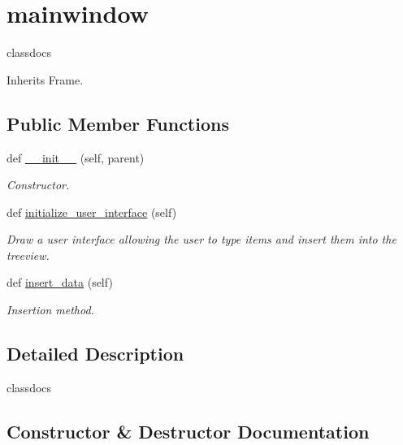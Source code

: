 \hypertarget{classbackpack_1_1src_1_1gui_1_1Tests_1_1Test2_1_1mainwindow}{}\section{mainwindow}
\label{classbackpack_1_1src_1_1gui_1_1Tests_1_1Test2_1_1mainwindow}


classdocs  




Inherits Frame.

\subsection*{Public Member Functions}
\begin{DoxyCompactItemize}
\item 
def \mbox{\hyperlink{classbackpack_1_1src_1_1gui_1_1Tests_1_1Test2_1_1mainwindow_a75020e7f3888d6f837fae592b305add8}{\+\_\+\+\_\+init\+\_\+\+\_\+}} (self, parent)
\begin{DoxyCompactList}\small\item\em Constructor. \end{DoxyCompactList}\item 
def \mbox{\hyperlink{classbackpack_1_1src_1_1gui_1_1Tests_1_1Test2_1_1mainwindow_a0f0c0d7bcb2c8a27adaafec4a451192e}{initialize\+\_\+user\+\_\+interface}} (self)
\begin{DoxyCompactList}\small\item\em Draw a user interface allowing the user to type items and insert them into the treeview. \end{DoxyCompactList}\item 
def \mbox{\hyperlink{classbackpack_1_1src_1_1gui_1_1Tests_1_1Test2_1_1mainwindow_a25ecc71dd76d8318250b20bed2e260bb}{insert\+\_\+data}} (self)
\begin{DoxyCompactList}\small\item\em Insertion method. \end{DoxyCompactList}\end{DoxyCompactItemize}


\subsection{Detailed Description}
classdocs 

\subsection{Constructor \& Destructor Documentation}
\mbox{\label{classbackpack_1_1src_1_1gui_1_1Tests_1_1Test2_1_1mainwindow_a75020e7f3888d6f837fae592b305add8}} 
